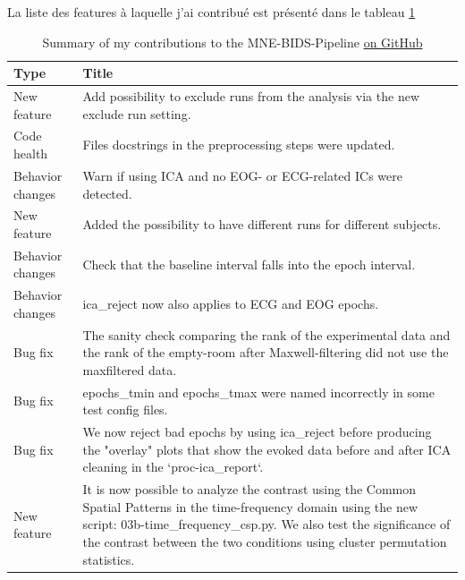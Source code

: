 La liste des features à laquelle j'ai contribué est présenté dans le tableau \ref{Tab:PR}

\begin{table}[ht]
    \centering
    \begin{tabular}{@{}| p{3cm}|p{9cm}| @{}}
        \hline
        Type & Title \\
        \hline
New feature & Add possibility to exclude runs from the analysis via the new exclude run setting. \\
Code health & Files docstrings in the preprocessing steps were updated. \\
Behavior changes & Warn if using ICA and no EOG- or ECG-related ICs were detected. \\
New feature & Added the possibility to have different runs for different subjects. \\
Behavior changes & Check that the baseline interval falls into the epoch interval. \\
Behavior changes & ica\_reject now also applies to ECG and EOG epochs. \\
Bug fix & The sanity check comparing the rank of the experimental data and the rank of the empty-room after Maxwell-filtering did not use the maxfiltered data. \\
Bug fix & epochs\_tmin and epochs\_tmax were named incorrectly in some test config files. \\
Bug fix & We now reject bad epochs by using ica\_reject before producing the "overlay" plots that show the evoked data before and after ICA cleaning in the `proc-ica\_report`. \\
New feature & It is now possible to analyze the contrast using the Common Spatial Patterns in the time-frequency domain using the new script: 03b-time\_frequency\_csp.py. We also test the significance of the contrast between the two conditions using cluster permutation statistics. \\
        \hline
    \end{tabular}
    
    \caption[Summary of my contributions to the MNE-BIDS-Pipeline.]%
    {Summary of my contributions to the MNE-BIDS-Pipeline \href{https://raw.githubusercontent.com/mne-tools/mne-bids-pipeline/main/docs/source/changes.md}{on GitHub}}
    \label{Tab:PR}
\end{table}

